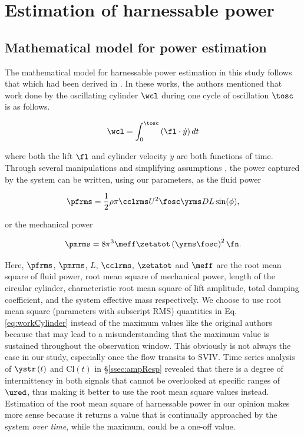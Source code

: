 \documentclass[a4paper,fleqn]{cas-sc}
\begin{document}
\section{Estimation of harnessable power} \label{sec:estimPow}
\subsection{Mathematical model for power estimation} \label{ssec:mathModel}
The mathematical model for harnessable power estimation in this study follows that which had been derived in \citet{Raghavanetal2007}. In these works, the authors mentioned that work done by the oscillating cylinder $\wcl$ during one cycle of oscillation $\tosc$ is as follows.

\begin{equation}
  \wcl = \int_{0}^{\tosc} \left ( \fl \cdot \dot{y} \right ) dt
  \label{eq:workCylinder}
\end{equation}

where both the lift $\fl$ and cylinder velocity $\dot{y}$ are both functions of time. Through several manipulations and simplifying assumptions \citep{Sun2016}, the power captured by the system can be written, using our parameters, as the fluid power

\begin{equation}
  \pfrms = \frac{1}{2} \rho \pi \cclrms U^{2} \fosc \yrms D L \sin(\phi),
  \label{eq:rmsFluidPower}
\end{equation}

\noindent or the mechanical power

\begin{equation}
  \pmrms = 8 \pi^{3} \meff \zetatot \left (\yrms \fosc \right )^{2} \fn.
  \label{eq:rmsMechPower}
\end{equation}

Here, $\pfrms$, $\pmrms$, $L$, $\cclrms$, $\zetatot$ and $\meff$ are the root mean square of fluid power, root mean square of mechanical power, length of the circular cylinder, characteristic root mean square of lift amplitude, total damping coefficient, and the system effective mass respectively. We choose to use root mean square (parameters with subscript RMS) quantities in Eq. \ref{eq:workCylinder} instead of the maximum values like the original authors because that may lead to a misunderstanding that the maximum value is sustained throughout the observation window. This obviously is not always the case in our study, especially once the flow transits to SVIV. Time series analysis of $\ystr\left( t \right)$ and $\text{Cl}\left( t \right)$ in \S\ref{ssec:ampResp} revealed that there is a degree of intermittency in both signals that cannot be overlooked at specific ranges of $\ured$, thus making it better to use the root mean square values instead. Estimation of the root mean square of harnessable power in our opinion makes more sense because it returns a value that is continually approached by the system \textit{over time}, while the maximum, could be a one-off value.
\end{document}
